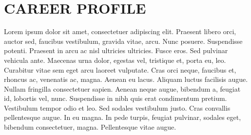 \documentclass[9pt,leftSidebar]{orbit-cv}
\begin{document}








\makeprofile


\section{\faUser{} CAREER PROFILE}
Lorem ipsum dolor sit amet, consectetuer adipiscing elit. Praesent libero orci, auctor sed, faucibus vestibulum, gravida vitae, arcu. Nunc posuere. Suspendisse potenti. Praesent in arcu ac nisl ultricies ultricies. Fusce eros. Sed pulvinar vehicula ante. Maecenas urna dolor, egestas vel, tristique et, porta eu, leo. Curabitur vitae sem eget arcu laoreet vulputate. Cras orci neque, faucibus et, rhoncus ac, venenatis ac, magna. Aenean eu lacus. Aliquam luctus facilisis augue. Nullam fringilla consectetuer sapien. Aenean neque augue, bibendum a, feugiat id, lobortis vel, nunc. Suspendisse in nibh quis erat condimentum pretium. Vestibulum tempor odio et leo. Sed sodales vestibulum justo. Cras convallis pellentesque augue. In eu magna. In pede turpis, feugiat pulvinar, sodales eget, bibendum consectetuer, magna. Pellentesque vitae augue.
\end{document}
